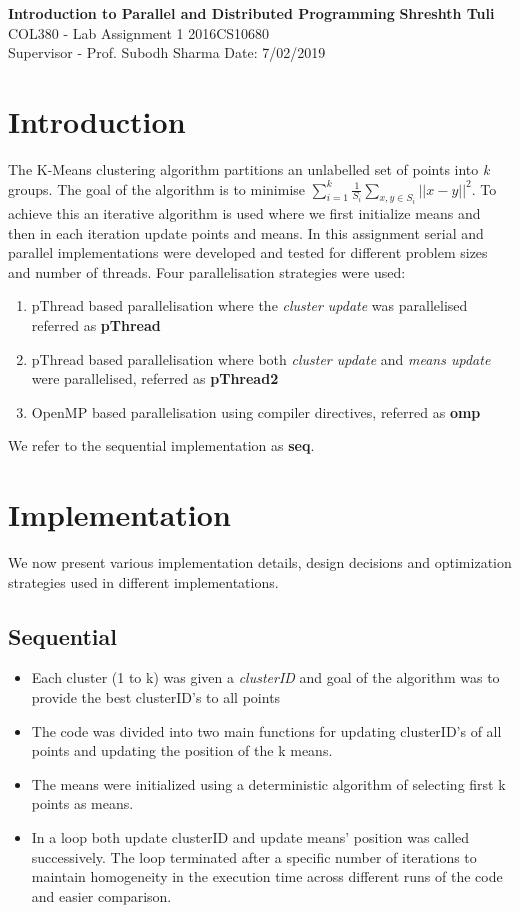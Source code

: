 \documentclass[a4paper, 11pt, margin=1in]{article}
\begin{document}
\noindent
\large\textbf{Introduction to Parallel and Distributed Programming} \hfill \textbf{Shreshth Tuli} \\
\normalsize COL380 - Lab Assignment 1 \hfill 2016CS10680\\
Supervisor - Prof. Subodh Sharma \hfill Date: 7/02/2019 \\

\section*{Introduction}

The K-Means clustering algorithm partitions an unlabelled set of points into \textit{k} groups. The goal of the algorithm is to minimise $\sum_{i=1}^k\frac{1}{S_i}\sum_{x,y\in S_i}||x-y||^2$. To achieve this an iterative algorithm is used where we first initialize means and then in each iteration update points and means. In this assignment serial and parallel implementations were developed and tested for different problem sizes and number of threads. Four parallelisation strategies were used:
\begin{enumerate}
    \item pThread based parallelisation where the \textit{cluster update} was parallelised referred as \textbf{pThread}
    \item pThread based parallelisation where both \textit{cluster update} and \textit{means update} were parallelised, referred as \textbf{pThread2}
    \item OpenMP based parallelisation using compiler directives, referred as \textbf{omp}
\end{enumerate}
We refer to the sequential implementation as \textbf{seq}.

\section{Implementation}
We now present various implementation details, design decisions and optimization strategies used in different implementations.

\subsection{Sequential}

\begin{itemize}
    \item Each cluster (1 to k) was given a \textit{clusterID} and goal of the algorithm was to provide the best clusterID's to all points
    \item The code was divided into two main functions for updating clusterID's of all points and updating the position of the k means.
    \item The means were initialized using a deterministic algorithm of selecting first k points as means.
    \item In a loop both update clusterID and update means' position was called successively. The loop terminated after a specific number of iterations to maintain homogeneity in the execution time across different runs of the code and easier comparison.
\end{itemize}
\end{document}
